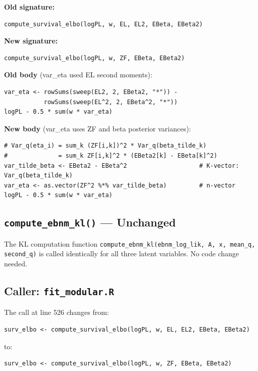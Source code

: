 \documentclass[11pt]{article}
\begin{document}
\begin{codebox}
\textbf{Old signature:}
\begin{verbatim}
compute_survival_elbo(logPL, w, EL, EL2, EBeta, EBeta2)
\end{verbatim}

\textbf{New signature:}
\begin{verbatim}
compute_survival_elbo(logPL, w, ZF, EBeta, EBeta2)
\end{verbatim}

\textbf{Old body} (var\_eta used EL second moments):
\begin{verbatim}
var_eta <- rowSums(sweep(EL2, 2, EBeta2, "*")) -
           rowSums(sweep(EL^2, 2, EBeta^2, "*"))
logPL - 0.5 * sum(w * var_eta)
\end{verbatim}

\textbf{New body} (var\_eta uses ZF and beta posterior variances):
\begin{verbatim}
# Var_q(eta_i) = sum_k (ZF[i,k])^2 * Var_q(beta_tilde_k)
#              = sum_k ZF[i,k]^2 * (EBeta2[k] - EBeta[k]^2)
var_tilde_beta <- EBeta2 - EBeta^2                    # K-vector: Var_q(beta_tilde_k)
var_eta <- as.vector(ZF^2 %*% var_tilde_beta)         # n-vector
logPL - 0.5 * sum(w * var_eta)
\end{verbatim}
\end{codebox}

\subsection{\texttt{compute\_ebnm\_kl()} — Unchanged}

The KL computation function \texttt{compute\_ebnm\_kl(ebnm\_log\_lik, A, x, mean\_q, second\_q)}
is called identically for all three latent variables. No code change needed.

\subsection{Caller: \texttt{fit\_modular.R}}

The call at line 526 changes from:
\begin{verbatim}
surv_elbo <- compute_survival_elbo(logPL, w, EL, EL2, EBeta, EBeta2)
\end{verbatim}
to:
\begin{verbatim}
surv_elbo <- compute_survival_elbo(logPL, w, ZF, EBeta, EBeta2)
\end{verbatim}
\end{document}
